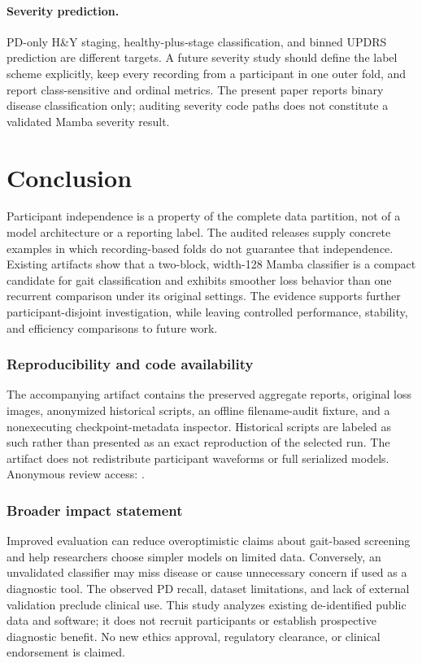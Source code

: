 \paragraph{Severity prediction.}
PD-only H\&Y staging, healthy-plus-stage classification, and binned UPDRS prediction are different targets. A future severity study should define the label scheme explicitly, keep every recording from a participant in one outer fold, and report class-sensitive and ordinal metrics. The present paper reports binary disease classification only; auditing severity code paths does not constitute a validated Mamba severity result.

\section{Conclusion}
Participant independence is a property of the complete data partition, not of a model architecture or a reporting label. The audited releases supply concrete examples in which recording-based folds do not guarantee that independence. Existing artifacts show that a two-block, width-128 Mamba classifier is a compact candidate for gait classification and exhibits smoother loss behavior than one recurrent comparison under its original settings. The evidence supports further participant-disjoint investigation, while leaving controlled performance, stability, and efficiency comparisons to future work.

\subsubsection*{Reproducibility and code availability}
The accompanying artifact contains the preserved aggregate reports, original loss images, anonymized historical scripts, an offline filename-audit fixture, and a nonexecuting checkpoint-metadata inspector. Historical scripts are labeled as such rather than presented as an exact reproduction of the selected run. The artifact does not redistribute participant waveforms or full serialized models. Anonymous review access: \AnonymousCodeLink.

\subsubsection*{Broader impact statement}
Improved evaluation can reduce overoptimistic claims about gait-based screening and help researchers choose simpler models on limited data. Conversely, an unvalidated classifier may miss disease or cause unnecessary concern if used as a diagnostic tool. The observed PD recall, dataset limitations, and lack of external validation preclude clinical use. This study analyzes existing de-identified public data and software; it does not recruit participants or establish prospective diagnostic benefit. No new ethics approval, regulatory clearance, or clinical endorsement is claimed.

